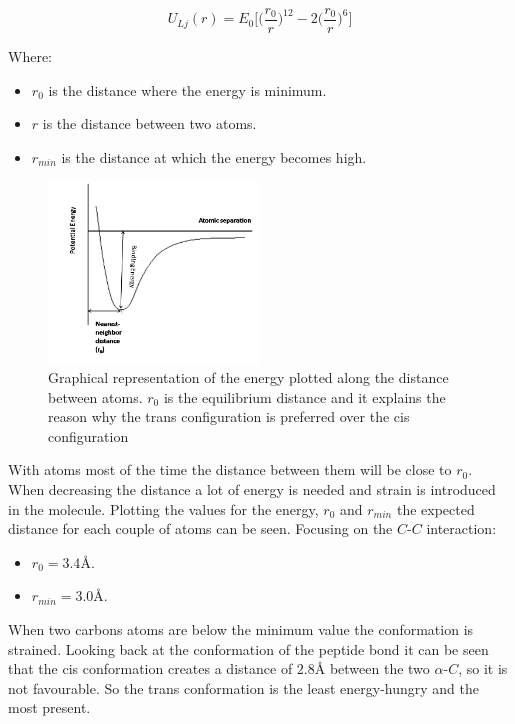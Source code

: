 	$$U_{Lj}(r) = E_0\biggl[\biggl(\frac{r_0}{r}\biggr)^{12}-2\biggl(\frac{r_0}{r}\biggr)^6\biggr]$$

	Where:

	\begin{multicols}{2}
		\begin{itemize}
			\item $r_0$ is the distance where the energy is minimum.
			\item $r$ is the distance between two atoms.
			\item $r_{min}$ is the distance at which the energy becomes high.
		\end{itemize}
	\end{multicols}

	\begin{figure}[H]
		\centering
		\includegraphics[width=0.5\textwidth]{potential.png}
		\caption{Graphical representation of the energy plotted along the distance between atoms. $r_0$ is the equilibrium distance and it explains the reason why the trans configuration is preferred over the cis configuration}
		\label{fig:potential}
	\end{figure}

	With atoms most of the time the distance between them will be close to $r_0$.
	When decreasing the distance a lot of energy is needed and strain is introduced in the molecule.
	Plotting the values for the energy, $r_0$ and $r_{min}$ the expected distance for each couple of atoms can be seen.
	Focusing on the $C$-$C$ interaction:

	\begin{multicols}{2}
		\begin{itemize}
			\item $r_0 = 3.4\si{\angstrom}$.
			\item $r_{min} = 3.0\si{\angstrom}$.
		\end{itemize}
	\end{multicols}

	When two carbons atoms are below the minimum value the conformation is strained.
	Looking back at the conformation of the peptide bond it can be seen that the cis conformation creates a distance of $2.8\si{\angstrom}$ between the two $\alpha$-$C$, so it is not favourable.
	So the trans conformation is the least energy-hungry and the most present.

